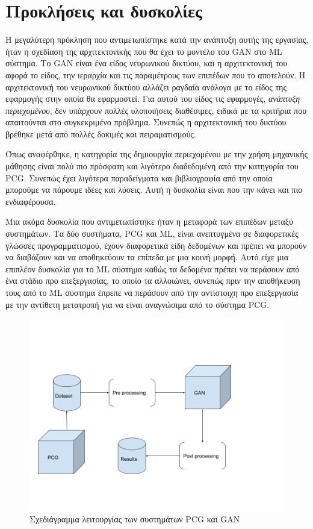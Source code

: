 \section{Προκλήσεις και δυσκολίες}
\par
Η μεγαλύτερη πρόκληση που αντιμετωπίστηκε κατά την ανάπτυξη αυτής της εργασίας, ήταν η σχεδίαση της αρχιτεκτονικής που θα έχει το μοντέλο του GAN στο ML σύστημα. Το GAN είναι ένα είδος νευρωνικού δικτύου, και η αρχιτεκτονική του αφορά το είδος, την ιεραρχία και τις παραμέτρους των επιπέδων που το αποτελούν. Η αρχιτεκτονική του νευρωνικού δικτύου αλλάζει ραγδαία ανάλογα με το είδος της εφαρμογής στην οποία θα εφαρμοστεί. Για αυτού του είδος τις εφαρμογές, \textit{ανάπτυξη περιεχομένου}, δεν υπάρχουν πολλές υλοποιήσεις διαθέσιμες, ειδικά με τα κριτήρια που απαιτούνται στο συγκεκριμένο πρόβλημα. Συνεπώς η αρχιτεκτονική του δικτύου βρέθηκε μετά από πολλές δοκιμές και πειραματισμούς.
\par
Όπως αναφέρθηκε, η κατηγορία της δημιουργία περιεχομένου με την χρήση μηχανικής μάθησης είναι πολύ πιο πρόσφατη και λιγότερο διαδεδομένη από την κατηγορία του PCG. Συνεπώς έχει λιγότερα παραδείγματα και βιβλιογραφία από την οποία μπορούμε να πάρουμε ιδέες και λύσεις. Αυτή η δυσκολία είναι που την κάνει και πιο ενδιαφέρουσα.
\par
Μια ακόμα δυσκολία που αντιμετωπίστηκε ήταν η μεταφορά των επιπέδων μεταξύ συστημάτων. Τα δύο συστήματα, PCG και ML, είναι ανεπτυγμένα σε διαφορετικές γλώσσες προγραμματισμού, έχουν διαφορετικά είδη δεδομένων και πρέπει να μπορούν να διαβάζουν και να αποθηκεύουν τα επίπεδα με μια κοινή μορφή. Αυτό είχε μια επιπλέον δυσκολία για το ML σύστημα καθώς τα δεδομένα πρέπει να περάσουν από ένα στάδιο προ επεξεργασίας, το οποίο τα αλλοιώνει, συνεπώς πριν την αποθήκευση τους από το ML σύστημα έπρεπε να περάσουν από την αντίστοιχη προ επεξεργασία με την αντίθετη μετατροπή για να είναι αναγνώσιμα από το σύστημα PCG.

\begin{figure}[H]
\centering
\includegraphics[width=.8\linewidth]{../images/graphs/Data_Cycle.png}
\caption{Σχεδιάγραμμα λειτουργίας των συστημάτων PCG και GAN}
\label{fig:fig}
\end{figure}




